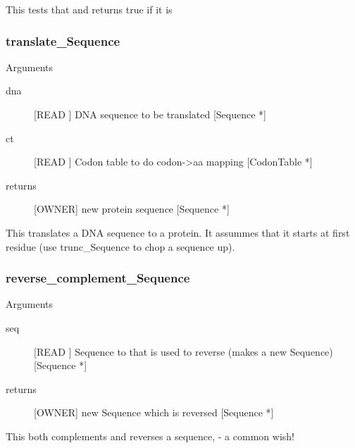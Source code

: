 This tests that and returns true if it is


\subsubsection{translate_Sequence}

Arguments
\begin{description}
\item[dna] [READ ] DNA sequence to be translated [Sequence *]
\item[ct] [READ ] Codon table to do codon->aa mapping [CodonTable *]
\item[returns] [OWNER] new protein sequence [Sequence *]
\end{description}
This translates a DNA sequence to a protein.
It assummes that it starts at first residue
(use trunc_Sequence to chop a sequence up).


\subsubsection{reverse_complement_Sequence}

Arguments
\begin{description}
\item[seq] [READ ] Sequence to that is used to reverse (makes a new Sequence) [Sequence *]
\item[returns] [OWNER] new Sequence which is reversed [Sequence *]
\end{description}
This both complements and reverses a sequence,
- a common wish!



